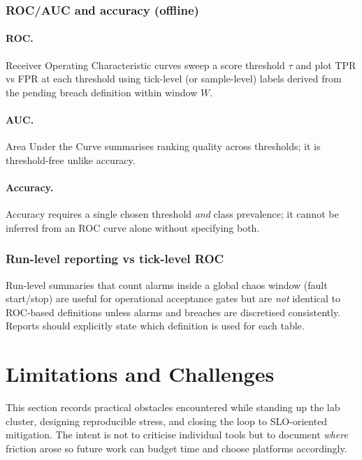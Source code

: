 \documentclass[11pt,a4paper]{article}
\begin{document}
\subsubsection*{ROC/AUC and accuracy (offline)}

\paragraph{ROC.}
Receiver Operating Characteristic curves sweep a score threshold $\tau$ and plot TPR vs FPR at each threshold using tick-level (or sample-level) labels derived from the pending breach definition within window $W$.

\paragraph{AUC.}
Area Under the Curve summarises ranking quality across thresholds; it is threshold-free unlike accuracy.

\paragraph{Accuracy.}
Accuracy requires a single chosen threshold \emph{and} class prevalence; it cannot be inferred from an ROC curve alone without specifying both.

\subsubsection*{Run-level reporting vs tick-level ROC}

Run-level summaries that count alarms inside a global chaos window (fault start/stop) are useful for operational acceptance gates but are \emph{not} identical to ROC-based definitions unless alarms and breaches are discretised consistently. Reports should explicitly state which definition is used for each table.

\section{Limitations and Challenges}
\label{sec:limitations}

This section records practical obstacles encountered while standing up the lab cluster, designing reproducible stress, and closing the loop to SLO-oriented mitigation. The intent is not to criticise individual tools but to document \emph{where} friction arose so future work can budget time and choose platforms accordingly.
\end{document}
